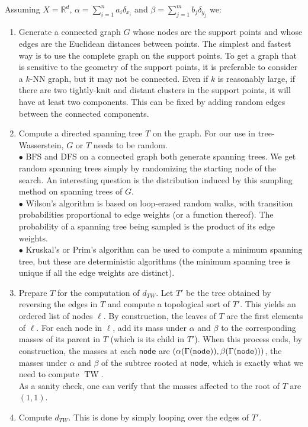 \documentclass[12pt]{report}
\theoremstyle{definition}
\theoremstyle{remark}
\DeclareMathOperator{\tw}{TW}
\begin{document}
Assuming $X=\mathbb R^d$, $\alpha=\sum_{i=1}^n a_i \delta_{x_i}$ and $\beta=\sum_{j=1}^m b_j \delta_{y_j}$ we:
	\begin{enumerate}
    \item Generate a connected graph $G$ whose nodes are the support points and whose edges are the Euclidean distances between points. The simplest and fastest way is to use the complete graph on the support points. To get a graph that is sensitive to the geometry of the support points, it is preferable to consider a $k$-NN graph, but it may not be connected. Even if $k$ is reasonably large, if there are two tightly-knit and distant clusters in the support points, it will have at least two components. This can be fixed by adding random edges between the connected components.

    \item Compute a directed spanning tree $T$ on the graph. For our use in tree-Wasserstein, $G$ or $T$ needs to be random.\\
    $\bullet$ BFS and DFS on a connected graph both generate spanning trees. We get random spanning trees simply by randomizing the starting node of the search. An interesting question is the distribution induced by this sampling method on spanning trees of $G$.\\
    $\bullet$ Wilson's algorithm \cite[Theorem~4.1]{lyons2017probability} is based on loop-erased random walks, with transition probabilities proportional to edge weights (or a function thereof). The probability of a spanning tree being sampled is the product of its edge weights.\\
    $\bullet$ Kruskal's or Prim's algorithm can be used to compute a minimum spanning tree, but these are deterministic algorithms (the minimum spanning tree is unique if all the edge weights are distinct).

    \item Prepare $T$ for the computation of $d_{TW}$. Let $T'$ be the tree obtained by reversing the edges in $T$ and compute a topological sort of $T'$. This yields an ordered list of nodes $\ell$. By construction, the leaves of $T$ are the first elements of $\ell$. For each node in $\ell$, add its mass under $\alpha$ and $\beta$ to the corresponding masses of its parent in $T$ (which is its child in $T'$). When this process ends, by construction, the masses at each \verb!node! are $(\alpha(\Gamma(\verb!node!)), \beta(\Gamma(\verb!node!)))$, the masses under $\alpha$ and $\beta$ of the subtree rooted at \verb!node!, which is exactly what we need to compute $\tw$.\\
    As a sanity check, one can verify that the masses affected to the root of $T$ are $(1,1)$.
    \item Compute $d_{TW}$. This is done by simply looping over the edges of $T'$.
    \end{enumerate}
\end{document}
